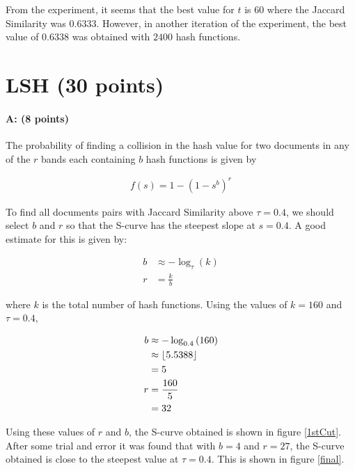 \documentclass[11pt]{article}
\DeclarePairedDelimiter\floor{\lfloor}{\rfloor}
\begin{document}
From the experiment, it seems that the best value for $t$ is $60$ where the Jaccard Similarity was $0.6333$. However, in another iteration of the experiment, the best value of $0.6338$ was obtained with $2400$ hash functions. 

\section{LSH (30 points)}

\paragraph{A: (8 points)} 

The probability of finding a collision in the hash value for two documents in any of the $r$ bands each containing $b$ hash functions is given by

\begin{equation*}
\begin{aligned}
f(s) = 1 - \left ( 1 - s^b \right ) ^ r
\end{aligned}
\end{equation*}

To find all documents pairs with Jaccard Similarity above $\tau = 0.4$, we should select $b$ and $r$ so that the S-curve has the steepest slope at $s=0.4$. A good estimate for this is given by:

\begin{equation*}
\begin{aligned}
b &\approx -\log_{\tau} \left (k \right )\\
r &= \frac{k}{b}
\end{aligned}
\end{equation*}

where $k$ is the total number of hash functions. Using the values of $k=160$ and $\tau=0.4$, 

\begin{equation*}
\begin{aligned}
b &\approx -\log_{0.4} \left (160 \right )\\
&\approx \floor*{5.5388}\\
&= 5\\
r &= \frac{160}{5}\\
&=32
\end{aligned}
\end{equation*}

Using these values of $r$ and $b$, the S-curve obtained is shown in figure \ref{1stCut}. After some trial and error it was found that with $b=4$ and $r=27$, the S-curve obtained is close to the steepest value at $\tau=0.4$. This is shown in figure \ref{final}.
\end{document}
